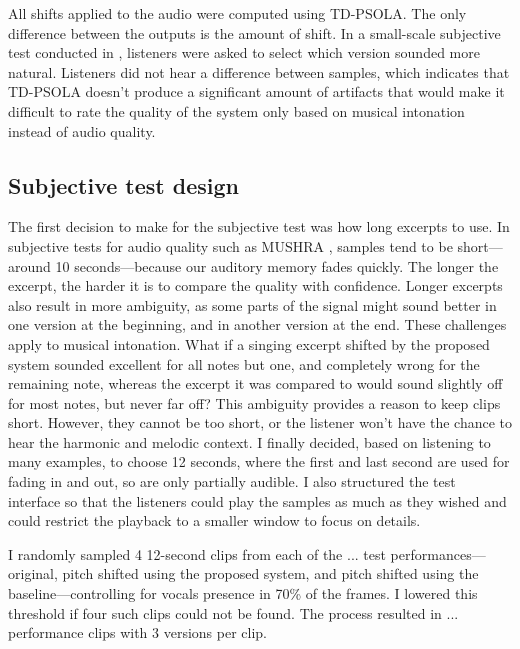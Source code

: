 All shifts applied to the audio were computed using TD-PSOLA. The only difference between the outputs is the amount of shift. In a small-scale subjective test conducted in \cite{wager2020deep}, listeners were asked to select which version sounded more natural. Listeners did not hear a difference between samples, which indicates that TD-PSOLA doesn't produce a significant amount of artifacts that would make it difficult to rate the quality of the system only based on musical intonation instead of audio quality.

\subsection{Subjective test design}
The first decision to make for the subjective test was how long excerpts to use. In subjective tests for audio quality such as MUSHRA \cite{mushra}, samples tend to be short---around 10 seconds---because our auditory memory fades quickly. The longer the excerpt, the harder it is to compare the quality with confidence. Longer excerpts also result in more ambiguity, as some parts of the signal might sound better in one version at the beginning, and in another version at the end. These challenges apply to musical intonation. What if a singing excerpt shifted by the proposed system sounded excellent for all notes but one, and completely wrong for the remaining note, whereas the excerpt it was compared to would sound slightly off for most notes, but never far off? This ambiguity provides a reason to keep clips short. However, they cannot be too short, or the listener won't have the chance to hear the harmonic and melodic context. I finally decided, based on listening to many examples, to choose 12 seconds, where the first and last second are used for fading in and out, so are only partially audible. I also structured the test interface so that the listeners could play the samples as much as they wished and could restrict the playback to a smaller window to focus on details. %

I randomly sampled 4 12-second clips from each of the ... test performances---original, pitch shifted using the proposed system, and pitch shifted using the baseline---controlling for vocals presence in 70\% of the frames. I lowered this threshold if four such clips could not be found. The process resulted in ...  performance clips with 3 versions per clip. 

